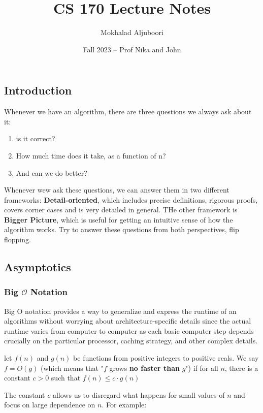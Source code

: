 \documentclass[12pt]{article}
\title{CS 170 Lecture Notes}
\author{Mokhalad Aljuboori}
\date{Fall 2023 -- Prof Nika and John}
\renewcommand{\O}{\mathcal{O}}
\begin{document}
\maketitle

\subsection{Introduction}
Whenever we have an algorithm, there are three questions we always ask about it:

\begin{enumerate}
    \item is it correct?
    \item How much time does it take, as a function of n?
    \item And can we do better?
\end{enumerate}

Whenever wew ask these questions, we can answer them in two different frameworks: \textbf{Detail-oriented}, which includes precise definitions, rigorous proofs, covers corner cases and is very detailed in general. THe other framework is \textbf{Bigger Picture}, which is useful for getting an intuitive sense of how the algorithm works. Try to answer these questions from both perspectives, flip flopping.

\subsection{Asymptotics}
\subsubsection{Big \texorpdfstring{$\O$}{O} Notation}
Big O notation provides a way to generalize and express the runtime of an algorithms without worrying about architecture-specific details since the actual runtime varies from computer to computer as each basic computer step depends crucially on the particular processor, caching strategy, and other complex details.

\begin{definition}
    let $f(n)$ and $g(n)$ be functions from positive integers to positive reals. We say $f = O(g)$ (which means that "$f$ grows \textbf{no faster than} $g$") if for all $n$, there is a constant $c > 0$ such that $f(n) \le c \cdot g(n)$
\end{definition}
The constant $c$ allows us to disregard what happens for small values of $n$ and focus on large dependence on $n$. For example:
\end{document}
